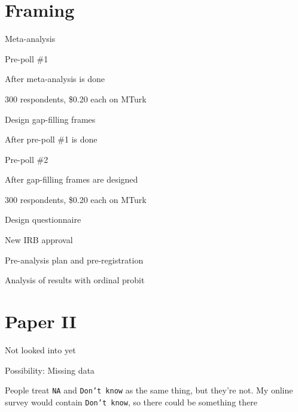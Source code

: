 \section*{Framing}
	\begin{coi}
		\item Meta-analysis
		\item Pre-poll \#1
			\begin{coi}
				\item After meta-analysis is done
				\item 300 respondents, \$0.20 each on MTurk
			\end{coi}
		\item Design gap-filling frames
			\begin{coi}
				\item After pre-poll \#1 is done
			\end{coi}
		\item Pre-poll \#2
			\begin{coi}
				\item After gap-filling frames are designed
				\item 300 respondents, \$0.20 each on MTurk
			\end{coi}
		\item Design questionnaire
		\item New IRB approval
		\item Pre-analysis plan and pre-registration
		\item Analysis of results with ordinal probit
	\end{coi}

\section*{Paper II}
	\begin{coi}
		\item Not looked into yet
		\item Possibility: Missing data
			\begin{coi}
				\item People treat {\tt NA} and {\tt Don't know} as the same thing, but they're not. My online survey would contain {\tt Don't know}, so there could be something there
			\end{coi}
	\end{coi}
	
